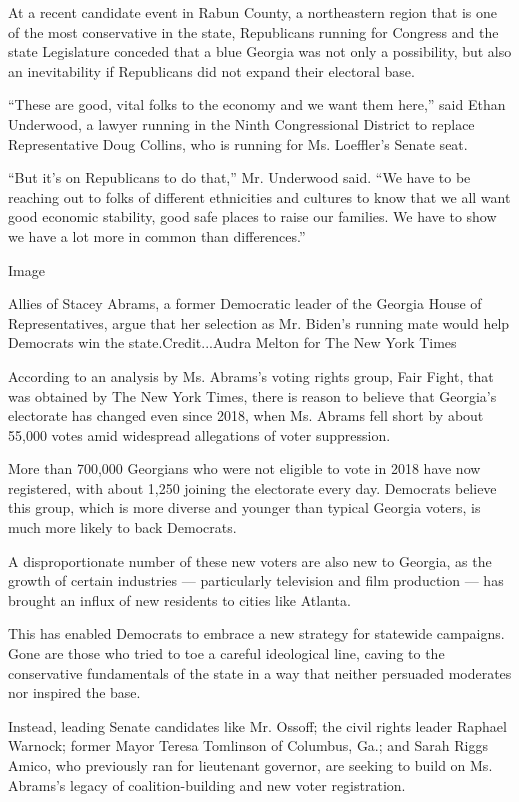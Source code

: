 At a recent candidate event in Rabun County, a northeastern region that
is one of the most conservative in the state, Republicans running for
Congress and the state Legislature conceded that a blue Georgia was not
only a possibility, but also an inevitability if Republicans did not
expand their electoral base.

``These are good, vital folks to the economy and we want them here,''
said Ethan Underwood, a lawyer running in the Ninth Congressional
District to replace Representative Doug Collins, who is running for Ms.
Loeffler's Senate seat.

``But it's on Republicans to do that,'' Mr. Underwood said. ``We have to
be reaching out to folks of different ethnicities and cultures to know
that we all want good economic stability, good safe places to raise our
families. We have to show we have a lot more in common than
differences.''

Image

Allies of Stacey Abrams, a former Democratic leader of the Georgia House
of Representatives, argue that her selection as Mr. Biden's running mate
would help Democrats win the state.Credit...Audra Melton for The New
York Times

According to an analysis by Ms. Abrams's voting rights group, Fair
Fight, that was obtained by The New York Times, there is reason to
believe that Georgia's electorate has changed even since 2018, when Ms.
Abrams fell short by about 55,000 votes amid widespread allegations of
voter suppression.

More than 700,000 Georgians who were not eligible to vote in 2018 have
now registered, with about 1,250 joining the electorate every day.
Democrats believe this group, which is more diverse and younger than
typical Georgia voters, is much more likely to back Democrats.

A disproportionate number of these new voters are also new to Georgia,
as the growth of certain industries --- particularly television and film
production --- has brought an influx of new residents to cities like
Atlanta.

This has enabled Democrats to embrace a new strategy for statewide
campaigns. Gone are those who tried to toe a careful ideological line,
caving to the conservative fundamentals of the state in a way that
neither persuaded moderates nor inspired the base.

Instead, leading Senate candidates like Mr. Ossoff; the civil rights
leader Raphael Warnock; former Mayor Teresa Tomlinson of Columbus, Ga.;
and Sarah Riggs Amico, who previously ran for lieutenant governor, are
seeking to build on Ms. Abrams's legacy of coalition-building and new
voter registration.

